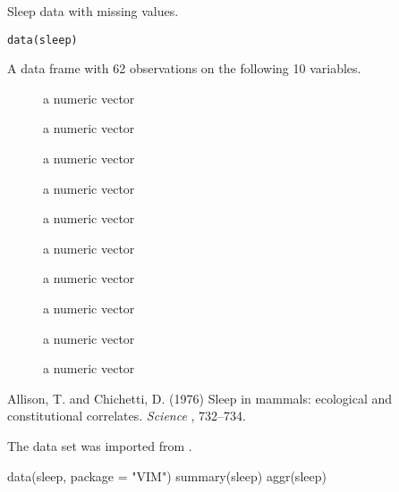 %
\begin{Description}\relax
Sleep data with missing values.
\end{Description}
%
\begin{Usage}
\begin{verbatim}
data(sleep)
\end{verbatim}
\end{Usage}
%
\begin{Format}
A data frame with 62 observations on the following 10 variables.
\begin{description}

\item[] a numeric vector
\item[] a numeric vector
\item[] a numeric vector
\item[] a numeric vector
\item[] a numeric vector
\item[] a numeric vector
\item[] a numeric vector
\item[] a numeric vector
\item[] a numeric vector
\item[] a numeric vector

\end{description}

\end{Format}
%
\begin{Source}\relax
Allison, T. and Chichetti, D. (1976) Sleep in mammals: ecological and 
constitutional correlates. \emph{Science} , 732--734.

The data set was imported from .
\end{Source}
%
\begin{Examples}
\begin{ExampleCode}
data(sleep, package = "VIM")
summary(sleep)
aggr(sleep)
\end{ExampleCode}
\end{Examples}

